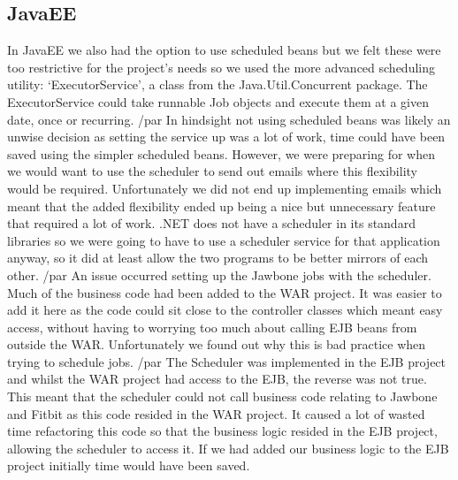 \subsection{JavaEE}
In JavaEE we also had the option to use scheduled beans but we felt these were too restrictive for the project’s needs so we used the more advanced scheduling utility: ‘ExecutorService’, a class from the Java.Util.Concurrent package. The ExecutorService could take runnable Job objects and execute them at a given date, once or recurring. /par
In hindsight not using scheduled beans was likely an unwise decision as setting the service up was a lot of work, time could have been saved using the simpler scheduled beans. However, we were preparing for when we would want to use the scheduler to send out emails where this flexibility would be required. Unfortunately we did not end up implementing emails which meant that the added flexibility ended up being a nice but unnecessary feature that required a lot of work. .NET does not have a scheduler in its standard libraries so we were going to have to use a scheduler service for that application anyway, so it did at least allow the two programs to be better mirrors of each other. /par
An issue occurred setting up the Jawbone jobs with the scheduler. Much of the business code had been added to the WAR project. It was easier to add it here as the code could sit close to the controller classes which meant easy access, without having to worrying too much about calling EJB beans from outside the WAR. Unfortunately we found out why this is bad practice when trying to schedule jobs. /par
The Scheduler was implemented in the EJB project and whilst the WAR project had access to the EJB, the reverse was not true. This meant that the scheduler could not call business code relating to Jawbone and Fitbit as this code resided in the WAR project. It caused a lot of wasted time refactoring this code so that the business logic resided in the EJB project, allowing the scheduler to access it. If we had added our business logic to the EJB project initially time would have been saved. 

